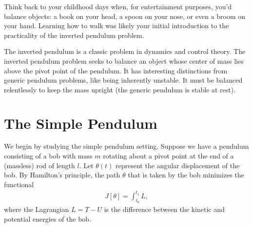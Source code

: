 \label{lab:inverted_pendulum}



Think back to your childhood days when, for entertainment purposes, you’d balance objects: a book on your head, a spoon on your nose, or even a broom on your hand.
 Learning how to walk was likely your initial introduction to the practicality of the inverted pendulum problem.

The inverted pendulum is a classic problem in dynamics and control theory. The inverted pendulum problem seeks to balance an object whose center of mass lies above the pivot point of the pendulum. 
It has interesting distinctions from generic pendulum problems, like being inherently unstable. 
It must be balanced relentlessly to keep the mass upright (the generic pendulum is stable at rest).


\section*{The Simple Pendulum}
We begin by studying the simple pendulum setting. 
Suppose we have a pendulum consisting of a bob with mass $m$ rotating about a pivot point at the end of a (massless) rod of length $l$. 
Let $\theta(t)$ represent the angular displacement of the bob. 
By Hamilton's principle, the path $\theta$ that is taken by the bob minimizes the functional 
\begin{align}
J[\theta] = \int_{t_0}^{t_1}	L,
\end{align}
where the Lagrangian $L = T - U$ is the difference between the kinetic and potential energies of the bob. 

